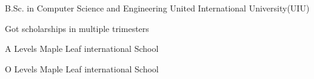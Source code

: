 

\begin{cventries}

\begin{custom1}
  \cventry
    {B.Sc. in Computer Science and Engineering} %
    {United International University(UIU)} %
    {} %
    {} %
    {
      \begin{cvitems} %
        \item {Got scholarships in multiple trimesters}
      \end{cvitems}
    }

    
    \cventry
    {A Levels} %
    {Maple Leaf international School} %
    {} %
    {} %
    {}
    
    \vspace{-3mm} %
    
    \cventry
    {O Levels} %
    {Maple Leaf international School} %
    {} %
    {} %
    {}


\end{custom1}
\end{cventries}
